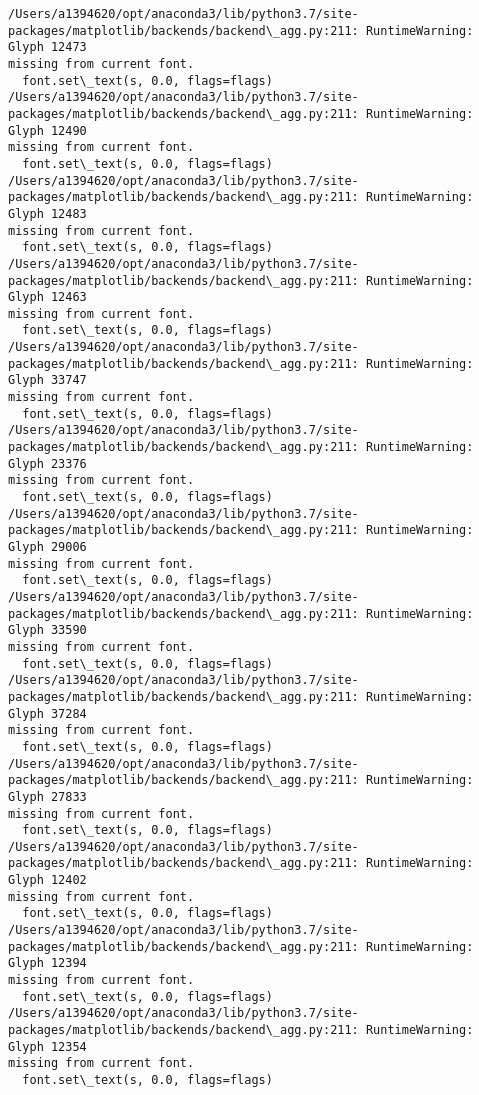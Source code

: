 \documentclass[11pt]{article}
\begin{document}
    \begin{Verbatim}[commandchars=\\\{\}]
/Users/a1394620/opt/anaconda3/lib/python3.7/site-
packages/matplotlib/backends/backend\_agg.py:211: RuntimeWarning: Glyph 12473
missing from current font.
  font.set\_text(s, 0.0, flags=flags)
/Users/a1394620/opt/anaconda3/lib/python3.7/site-
packages/matplotlib/backends/backend\_agg.py:211: RuntimeWarning: Glyph 12490
missing from current font.
  font.set\_text(s, 0.0, flags=flags)
/Users/a1394620/opt/anaconda3/lib/python3.7/site-
packages/matplotlib/backends/backend\_agg.py:211: RuntimeWarning: Glyph 12483
missing from current font.
  font.set\_text(s, 0.0, flags=flags)
/Users/a1394620/opt/anaconda3/lib/python3.7/site-
packages/matplotlib/backends/backend\_agg.py:211: RuntimeWarning: Glyph 12463
missing from current font.
  font.set\_text(s, 0.0, flags=flags)
/Users/a1394620/opt/anaconda3/lib/python3.7/site-
packages/matplotlib/backends/backend\_agg.py:211: RuntimeWarning: Glyph 33747
missing from current font.
  font.set\_text(s, 0.0, flags=flags)
/Users/a1394620/opt/anaconda3/lib/python3.7/site-
packages/matplotlib/backends/backend\_agg.py:211: RuntimeWarning: Glyph 23376
missing from current font.
  font.set\_text(s, 0.0, flags=flags)
/Users/a1394620/opt/anaconda3/lib/python3.7/site-
packages/matplotlib/backends/backend\_agg.py:211: RuntimeWarning: Glyph 29006
missing from current font.
  font.set\_text(s, 0.0, flags=flags)
/Users/a1394620/opt/anaconda3/lib/python3.7/site-
packages/matplotlib/backends/backend\_agg.py:211: RuntimeWarning: Glyph 33590
missing from current font.
  font.set\_text(s, 0.0, flags=flags)
/Users/a1394620/opt/anaconda3/lib/python3.7/site-
packages/matplotlib/backends/backend\_agg.py:211: RuntimeWarning: Glyph 37284
missing from current font.
  font.set\_text(s, 0.0, flags=flags)
/Users/a1394620/opt/anaconda3/lib/python3.7/site-
packages/matplotlib/backends/backend\_agg.py:211: RuntimeWarning: Glyph 27833
missing from current font.
  font.set\_text(s, 0.0, flags=flags)
/Users/a1394620/opt/anaconda3/lib/python3.7/site-
packages/matplotlib/backends/backend\_agg.py:211: RuntimeWarning: Glyph 12402
missing from current font.
  font.set\_text(s, 0.0, flags=flags)
/Users/a1394620/opt/anaconda3/lib/python3.7/site-
packages/matplotlib/backends/backend\_agg.py:211: RuntimeWarning: Glyph 12394
missing from current font.
  font.set\_text(s, 0.0, flags=flags)
/Users/a1394620/opt/anaconda3/lib/python3.7/site-
packages/matplotlib/backends/backend\_agg.py:211: RuntimeWarning: Glyph 12354
missing from current font.
  font.set\_text(s, 0.0, flags=flags)

\end{Verbatim}
\end{document}
